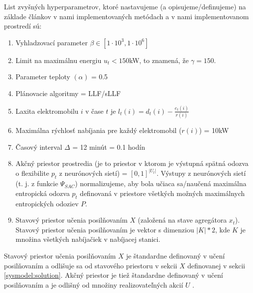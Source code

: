 
List zvyšných hyperparametrov, ktoré nastavujeme (a opisujeme/definujeme) na základe článkov \cite{Li_information_aggregation,Li_2021,li2020realtimeflexibilityfeedbackclosedloop} v nami implementovaných metódach a v nami implementovanom prostredí sú:
\begin{enumerate}
    \item Vyhladzovací parameter $\beta \in [1 \cdot 10^{3}, 1 \cdot 10^{6}]$
    \item Limit na maximálnu energiu $u_{t} < 150$kW, to znamená, že $\gamma = 150$.
    \item Parameter teploty $(\alpha)$ = 0.5
    \item Plánovacie algoritmy = LLF/sLLF
    \item Laxita elektromobilu $i$ v čase $t$ je $l_{t}(i) = d_{t}(i) - \frac{e_{t}(i)}{r(i)}$
    
    \item Maximálna rýchlosť nabíjania pre každý elektromobil ($r(i)$) = 10kW 
    \item Časový interval $\Delta$ = 12 minút = 0.1 hodín
    \item Akčný priestor prostredia (je to priestor v ktorom je výstupná spätná odozva o flexibilite $p_{t}$ z neurónových sietí) = $[0, 1]^{|U_{t}|}$. Výstupy z neurónových sietí (t. j. z funkcie $\Psi_{SAC}$) normalizujeme, aby bola učiaca sa/naučená maximálna entropická odozva $p_{t}$ definovaná v priestore všetkých možných maximálnych entropických odoziev $P$.
    \item Stavový priestor učenia posilňovaním $X$ (založená na stave agregátora $x_{t}$). Stavový priestor učenia posilňovaním je vektor s dimenziou $|K|*2$, kde $K$ je množina všetkých nabíjačiek v nabíjacej stanici. 
\end{enumerate}

Stavový priestor učenia posilňovaním $X$ je štandardne definovaný v učení posilňovaním a odlišuje sa od stavového priestoru v sekcii $X$ definovanej v sekcii \ref{sysmodel:solution}. Akčný priestor je tiež štandardne definovaný v učení posilňovaním a je odlišný od množiny realizovateľných akcií $U$ \cite{Li_2021}.  

